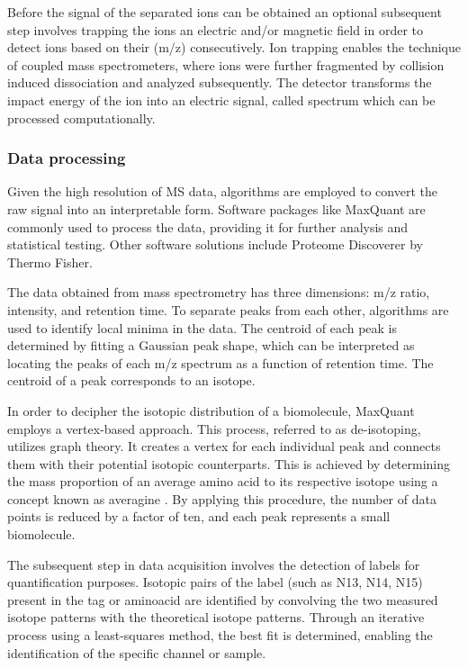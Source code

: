 \documentclass[
  11pt,
]{article}
\begin{document}
Before the signal of the separated ions can be obtained an optional subsequent step involves trapping the ions an electric and/or magnetic field in order to detect ions based on their (m/z) consecutively. Ion trapping enables the technique of coupled mass spectrometers, where ions were further fragmented by collision induced dissociation and analyzed subsequently. The detector transforms the impact energy of the ion into an electric signal, called spectrum which can be processed computationally.

\hypertarget{data-processing}{%
\subsubsection{Data processing}\label{data-processing}}

Given the high resolution of MS data, algorithms are employed to convert the raw signal into an interpretable form. Software packages like MaxQuant \citep{Cox2008} are commonly used to process the data, providing it for further analysis and statistical testing. Other software solutions include Proteome Discoverer by Thermo Fisher.

The data obtained from mass spectrometry has three dimensions: m/z ratio, intensity, and retention time. To separate peaks from each other, algorithms are used to identify local minima in the data. The centroid of each peak is determined by fitting a Gaussian peak shape, which can be interpreted as locating the peaks of each m/z spectrum as a function of retention time. The centroid of a peak corresponds to an isotope.

In order to decipher the isotopic distribution of a biomolecule, MaxQuant employs a vertex-based approach. This process, referred to as de-isotoping, utilizes graph theory. It creates a vertex for each individual peak and connects them with their potential isotopic counterparts. This is achieved by determining the mass proportion of an average amino acid to its respective isotope using a concept known as averagine \citep{Senko1995}. By applying this procedure, the number of data points is reduced by a factor of ten, and each peak represents a small biomolecule.

The subsequent step in data acquisition involves the detection of labels for quantification purposes. Isotopic pairs of the label (such as N13, N14, N15) present in the tag or aminoacid are identified by convolving the two measured isotope patterns with the theoretical isotope patterns. Through an iterative process using a least-squares method, the best fit is determined, enabling the identification of the specific channel or sample.
\end{document}
